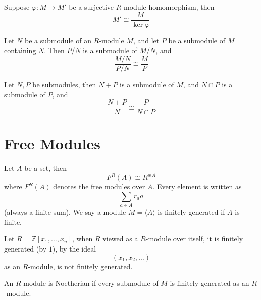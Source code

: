 \documentclass[openany]{book}
\newcommand{\Z}{\mathbb{Z}}
\newcommand{\la}{\langle}
\newcommand{\ra}{\rangle}
\begin{document}
\begin{thm}
    Suppose $\varphi: M\to M'$ be a surjective $R$-module homomorphism, then 
    \begin{equation*}
        M'\cong\frac{M}{\ker\varphi}
    \end{equation*}
\end{thm}

\begin{prop}
    Let $N$ be a submodule of an $R$-module $M$, and let $P$ be a submodule of $M$ containing $N$. Then $P/N$ is a submodule of $M/N$, and 
    \begin{equation*}
        \frac{M/N}{P/N}\cong\frac{M}{P}
    \end{equation*}
\end{prop}

\begin{prop}
    Let $N,P$ be submodules, then $N+P$ is a submodule of $M$, and $N\cap P$ is a submodule of $P$, and 
    \begin{equation*}
        \frac{N+P}{N}\cong\frac{P}{N\cap P}
    \end{equation*}
\end{prop}


\section{Free Modules}

\begin{defn}
    Let $A$ be a set, then 
    \begin{equation*}
        F^R(A)\cong R^{\oplus A}
    \end{equation*}
    where $F^R(A)$ denotes the free modules over $A$. Every element is written as 
    \begin{equation*}
        \sum_{a\in A}r_aa
    \end{equation*}
    (always a finite sum). We say a module $M=\la A\ra$ is finitely generated if $A$ is finite.
\end{defn}

\begin{example}
    Let $R=\Z[x_1,\dots,x_n]$, when $R$ viewed as a $R$-module over itself, it is finitely generated (by $1$), by the ideal 
    \begin{equation*}
        (x_1,x_2,\dots)
    \end{equation*}
    as an $R$-module, is not finitely generated. 
\end{example}

\begin{defn}
    An $R$-module is Noetherian if every submodule of $M$ is finitely generated as an $R$-module.
\end{defn}
\end{document}
